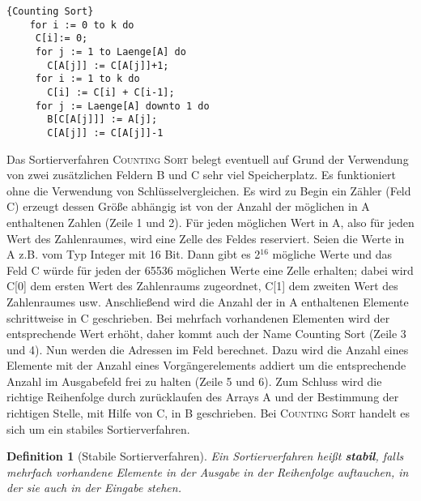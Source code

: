 \documentclass[ngerman,draft,parskip=half*,twoside]{scrreprt}
\theoremstyle{break}
\newtheorem{definition}{Definition}
\begin{document}
  \begin{Algorithmus}[H]
    \begin{lstlisting}[frame=tlrb, mathescape=true, title=\textsc{Counting Sort}, gobble=4]{Counting Sort}
    for i := 0 to k do
     C[i]:= 0;
     for j := 1 to Laenge[A] do
       C[A[j]] := C[A[j]]+1;
     for i := 1 to k do
       C[i] := C[i] + C[i-1];
     for j := Laenge[A] downto 1 do
       B[C[A[j]]] := A[j];
       C[A[j]] := C[A[j]]-1
    \end{lstlisting}

  Das Sortierverfahren \textsc{Counting Sort}  belegt eventuell auf Grund der Verwendung von zwei zusätzlichen Feldern 
  B und C sehr viel Speicherplatz.
  Es funktioniert ohne die Verwendung von Schlüsselvergleichen. Es wird zu Begin ein Zähler (Feld C) erzeugt 
  dessen Größe abhängig ist von der Anzahl der möglichen in A 
  enthaltenen Zahlen (Zeile 1 und 2). Für jeden möglichen Wert in A, also für jeden Wert des Zahlenraumes, wird eine Zelle des Feldes
  reserviert. Seien die Werte in A z.B. vom Typ Integer mit 16 Bit. Dann gibt es 2$^{16}$ mögliche Werte und das Feld C würde für
  jeden der 65536 möglichen Werte eine Zelle erhalten; dabei wird C[0] dem ersten Wert des Zahlenraums zugeordnet, C[1] dem zweiten
  Wert des Zahlenraumes usw.
  Anschließend wird die Anzahl der in 
  A enthaltenen Elemente schrittweise in C geschrieben. Bei mehrfach 
  vorhandenen Elementen wird der entsprechende Wert erhöht, daher kommt auch 
  der Name Counting Sort (Zeile 3 und 4). Nun werden die Adressen im Feld
  berechnet. Dazu wird die Anzahl eines Elemente mit der Anzahl eines 
  Vorgängerelements addiert um die entsprechende Anzahl im Ausgabefeld frei 
  zu halten (Zeile 5 und 6). Zum Schluss wird die richtige Reihenfolge durch 
  zurücklaufen des Arrays A und der Bestimmung der richtigen Stelle, mit Hilfe 
  von C, in B geschrieben. Bei \textsc{Counting Sort} handelt es sich um ein stabiles Sortierverfahren.
  \end{Algorithmus}
  
  \begin{definition}[Stabile Sortierverfahren]
  Ein Sortierverfahren heißt \textbf{stabil}, falls mehrfach vorhandene Elemente in der Ausgabe in der Reihenfolge auftauchen, in der sie auch
  in der Eingabe stehen.
  \end{definition}
  
\end{document}
